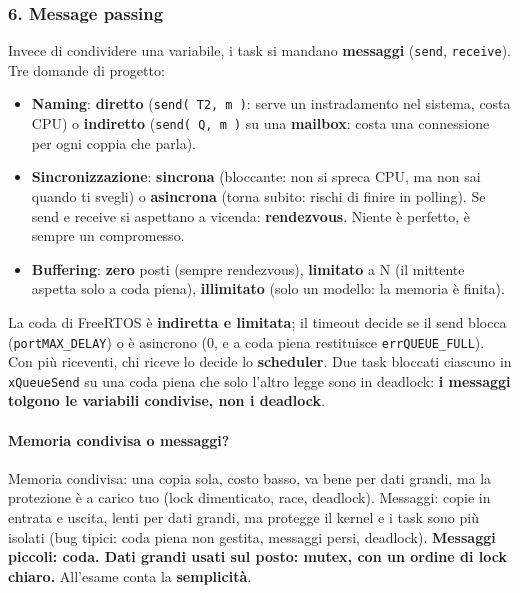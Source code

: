 \subsubsection*{6. Message passing}
Invece di condividere una variabile, i task si mandano \textbf{messaggi} (\texttt{send}, \texttt{receive}). Tre domande di progetto:
\begin{itemize}
    \item \textbf{Naming}: \textbf{diretto} (\texttt{send( T2, m )}: serve un instradamento nel sistema, costa CPU) o \textbf{indiretto} (\texttt{send( Q, m )} su una \textbf{mailbox}: costa una connessione per ogni coppia che parla).
    \item \textbf{Sincronizzazione}: \textbf{sincrona} (bloccante: non si spreca CPU, ma non sai quando ti svegli) o \textbf{asincrona} (torna subito: rischi di finire in polling). Se send e receive si aspettano a vicenda: \textbf{rendezvous}. Niente è perfetto, è sempre un compromesso.
    \item \textbf{Buffering}: \textbf{zero} posti (sempre rendezvous), \textbf{limitato} a N (il mittente aspetta solo a coda piena), \textbf{illimitato} (solo un modello: la memoria è finita).
\end{itemize}
La coda di FreeRTOS è \textbf{indiretta e limitata}; il timeout decide se il send blocca (\texttt{portMAX\_DELAY}) o è asincrono (0, e a coda piena restituisce \texttt{errQUEUE\_FULL}). Con più riceventi, chi riceve lo decide lo \textbf{scheduler}. Due task bloccati ciascuno in \texttt{xQueueSend} su una coda piena che solo l'altro legge sono in deadlock: \textbf{i messaggi tolgono le variabili condivise, non i deadlock}.

\paragraph*{Memoria condivisa o messaggi?} Memoria condivisa: una copia sola, costo basso, va bene per dati grandi, ma la protezione è a carico tuo (lock dimenticato, race, deadlock). Messaggi: copie in entrata e uscita, lenti per dati grandi, ma protegge il kernel e i task sono più isolati (bug tipici: coda piena non gestita, messaggi persi, deadlock). \textbf{Messaggi piccoli: coda. Dati grandi usati sul posto: mutex, con un ordine di lock chiaro.} All'esame conta la \textbf{semplicità}.

